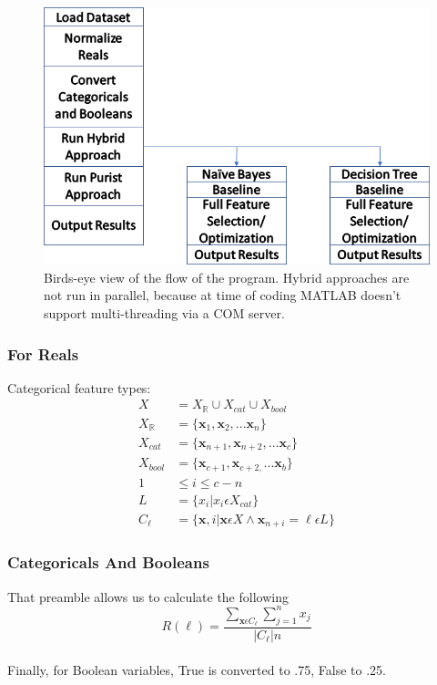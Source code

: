 \documentclass{beamer}
\begin{document}
\begin{frame}
\begin{figure}
	\centering
	\includegraphics[width=0.7\linewidth]{figures/png/ProgramFlow}
	\caption[Overall Program Flow]{Birds-eye view of the flow of the program.
		Hybrid approaches are not run in parallel, because at time of coding MATLAB
		doesn't support multi-threading via a COM server.}
	\label{fig:ProgramFlow}
\end{figure}
\end{frame}
\begin{frame}
	\frametitle{For Reals}
	Categorical feature types:
	\begin{align*}
	X &= {X_\mathbb{R} \cup X_{cat} \cup X_{bool}}\\
X_\mathbb{R} &= \{\textbf{x}_1, \textbf{x}_2, ... \textbf{x}_n\}\\
X_{cat} &= \{\textbf{x}_{n+1}, \textbf{x}_{n+2}, ... \textbf{x}_c\}\\%
X_{bool} &= \{\textbf{x}_{c+1}, \textbf{x}_{c+2,} ... \textbf{x}_b\} \\
1&\leq i \leq c-n\\
L &= \{x_i|x_i\epsilon X_{cat}\}\\%
C_\ell &= \{\textbf{x}, i|  \textbf{x}\epsilon X \wedge \textbf{x}_{n+i} = \ell\epsilon L \}
	\end{align*}
	
\end{frame}
\begin{frame}
	\frametitle{Categoricals And Booleans}
	That preamble allows us to calculate the following
	$$
	R(\ell) = \frac{\sum_{\textbf{x}\epsilon C_\ell}\sum_{j=1}^{n}x_j}{|C_\ell|n}
	$$
	\\Finally, for Boolean variables, 
	True is converted to .75, False to .25.
\end{frame}
\end{document}

